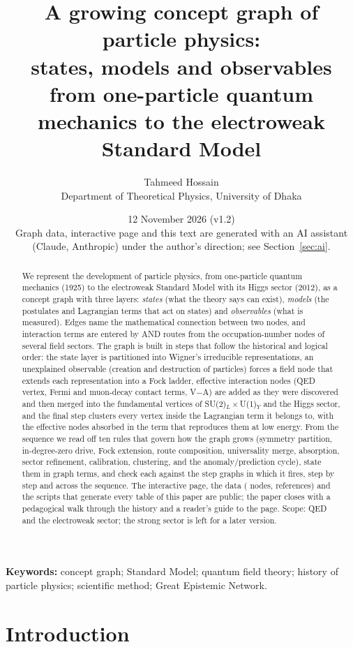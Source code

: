 \documentclass[11pt,a4paper]{article}
\title{A growing concept graph of particle physics:\\states, models and observables from one-particle quantum mechanics to the electroweak Standard Model}
\author{Tahmeed Hossain\\[2pt]\small Department of Theoretical Physics, University of Dhaka}
\date{\small 12 November 2026 (v1.2) \\[4pt] \small Graph data, interactive page and this text are generated with an AI assistant (Claude, Anthropic) under the author's direction; see Section~\ref{sec:ai}.}
\begin{document}
\maketitle

\begin{abstract}
We represent the development of particle physics, from one-particle quantum mechanics (1925) to the electroweak Standard Model with its Higgs sector (2012), as a concept graph with three layers: \emph{states} (what the theory says can exist), \emph{models} (the postulates and Lagrangian terms that act on states) and \emph{observables} (what is measured). Edges name the mathematical connection between two nodes, and interaction terms are entered by AND routes from the occupation-number nodes of several field sectors. The graph is built in \nGraphSteps{} steps that follow the historical and logical order: the state layer is partitioned into Wigner's irreducible representations, an unexplained observable (creation and destruction of particles) forces a field node that extends each representation into a Fock ladder, effective interaction nodes (QED vertex, Fermi and muon-decay contact terms, V$-$A) are added as they were discovered and then merged into the fundamental vertices of SU(2)$_L\times$U(1)$_Y$ and the Higgs sector, and the final step clusters every vertex inside the Lagrangian term it belongs to, with the effective nodes absorbed in the term that reproduces them at low energy. From the sequence we read off ten rules that govern how the graph grows (symmetry partition, in-degree-zero drive, Fock extension, route composition, universality merge, absorption, sector refinement, calibration, clustering, and the anomaly/prediction cycle), state them in graph terms, and check each against the step graphs in which it fires, step by step and across the sequence. The interactive page, the data (\nNodes{} nodes, \nRefs{} references) and the scripts that generate every table of this paper are public; the paper closes with a pedagogical walk through the history and a reader's guide to the page. Scope: QED and the electroweak sector; the strong sector is left for a later version.
\end{abstract}

\noindent\textbf{Keywords:} concept graph; Standard Model; quantum field theory; history of particle physics; scientific method; Great Epistemic Network.

\tableofcontents

\section{Introduction}\label{sec:intro}
\end{document}
